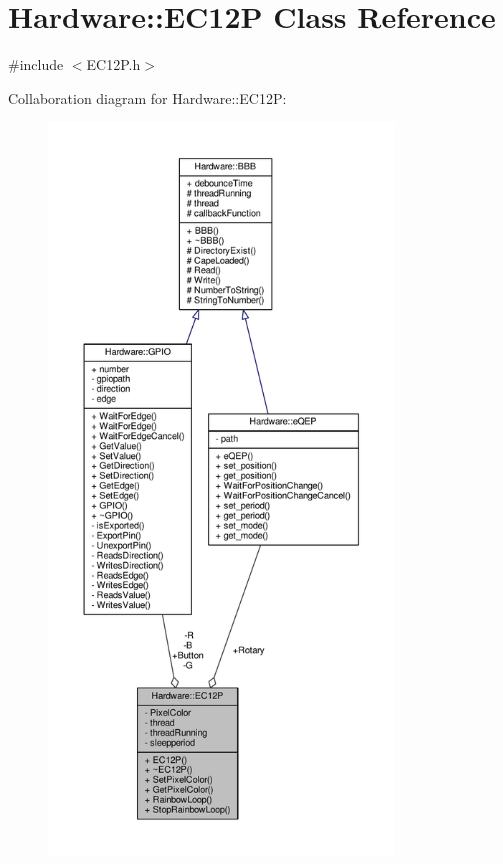 \hypertarget{class_hardware_1_1_e_c12_p}{}\section{Hardware\+:\+:E\+C12\+P Class Reference}
\label{class_hardware_1_1_e_c12_p}


{\ttfamily \#include $<$E\+C12\+P.\+h$>$}



Collaboration diagram for Hardware\+:\+:E\+C12\+P\+:\nopagebreak
\begin{figure}[H]
\begin{center}
\leavevmode
\includegraphics[height=550pt]{class_hardware_1_1_e_c12_p__coll__graph}
\end{center}
\end{figure}

